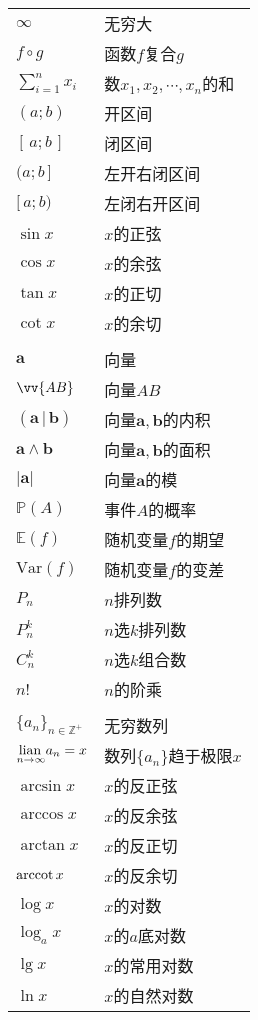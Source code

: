 \documentclass[12pt,UTF8]{article}
\begin{document}
\begin{longtable}{ m{15em} m{15em} }
    $\infty$ & 无穷大 \\
    $f\circ g$ & 函数$f$复合$g$ \\
    $\displaystyle\sum_{i=1}^n x_i$ & 数$x_1, x_2, \cdots, x_n$的和 \\
    $(a;b)$ & 开区间 \\
    $[\,a;b\,]$ & 闭区间 \\
    $(a;b\,]$ & 左开右闭区间 \\
    $[\,a;b)$ & 左闭右开区间 \\
    $\sin{x}$ & $x$的正弦 \\
    $\cos{x}$ & $x$的余弦 \\
    $\tan{x}$ & $x$的正切 \\
    $\cot{x}$ & $x$的余切 \\
    & \\
    $\mathbf{a}$ & 向量 \\
    $\vv{AB}$ & 向量$AB$\\
    $(\mathbf{a}\, | \, \mathbf{b})$ & 向量$\mathbf{a},\mathbf{b}$的内积 \\
    $\mathbf{a}\wedge \mathbf{b}$ & 向量$\mathbf{a},\mathbf{b}$的面积 \\
    $|\mathbf{a}|$ & 向量$\mathbf{a}$的模 \\
    $\mathbb{P}(A)$ & 事件$A$的概率 \\
    $\mathbb{E}(f)$ & 随机变量$f$的期望 \\
    $\mathrm{Var}(f)$ & 随机变量$f$的变差 \\
    $P_n$ & $n$排列数 \\
    $P_n^k$ & $n$选$k$排列数 \\
    $C_n^k$ & $n$选$k$组合数 \\
    $n!$ & $n$的阶乘 \\
    & \\
    $\displaystyle\{a_n\}_{n\in\mathbb{Z}^+}$ & 无穷数列 \\
    $\underset{n\to \infty}{\operatorname{lian}\,} a_n = x$ & 数列$\{a_n\}$趋于极限$x$ \\
    $\arcsin{x}$ & $x$的反正弦 \\
    $\arccos{x}$ & $x$的反余弦 \\
    $\arctan{x}$ & $x$的反正切 \\
    $\operatorname{arccot}{x}$ & $x$的反余切 \\
    $\log{x}$ & $x$的对数 \\
    $\log_a{x}$ & $x$的$a$底对数 \\
    $\lg{x}$ & $x$的常用对数 \\
    $\ln{x}$ & $x$的自然对数 \\

\end{longtable}
\end{document}
